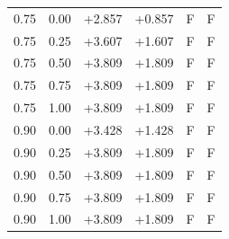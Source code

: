 \documentclass[preprint,11pt,authoryear]{elsarticle}
\begin{document}
\begin{longtable}{rr rr cc}
0.75 & 0.00 & +2.857 & +0.857 & F & F\\
0.75 & 0.25 & +3.607 & +1.607 & F & F\\
0.75 & 0.50 & +3.809 & +1.809 & F & F\\
0.75 & 0.75 & +3.809 & +1.809 & F & F\\
0.75 & 1.00 & +3.809 & +1.809 & F & F\\
0.90 & 0.00 & +3.428 & +1.428 & F & F\\
0.90 & 0.25 & +3.809 & +1.809 & F & F\\
0.90 & 0.50 & +3.809 & +1.809 & F & F\\
0.90 & 0.75 & +3.809 & +1.809 & F & F\\
0.90 & 1.00 & +3.809 & +1.809 & F & F\\
\end{longtable}\endgroup
\renewcommand{\thetable}{I4}
\end{document}
